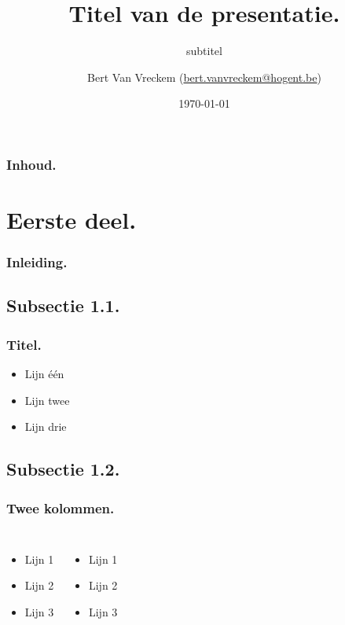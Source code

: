 \documentclass[aspectratio=169]{beamer}
\title[Korte titel]{Titel van de presentatie.}
\subtitle{subtitel}
\author[BVV]{Bert {Van Vreckem} (\href{mailto:bert.vanvreckem@hogent.be}{bert.vanvreckem@hogent.be})}
\date{\today}
\begin{document}
\frame{\maketitle}

\begin{frame}
  \frametitle{Inhoud.}

  \tableofcontents
\end{frame}
 

\section{Eerste deel.}

\begin{frame}
  \frametitle{Inleiding.}
\end{frame}

\subsection{Subsectie 1.1.}

\begin{frame}
  \frametitle{Titel.}

  \begin{itemize}
  \item Lijn één
  \item Lijn twee
  \item Lijn drie
  \end{itemize}
\end{frame}

\subsection{Subsectie 1.2.}

\begin{frame}
  \frametitle{Twee kolommen.}

  \begin{columns}[c]

    \begin{itemize}
    \item Lijn 1
    \item Lijn 2
    \item Lijn 3
    \end{itemize}

    \begin{itemize}
    \item Lijn 1
    \item Lijn 2
    \item Lijn 3
    \end{itemize}

  \end{columns}
\end{frame}
\end{document}
